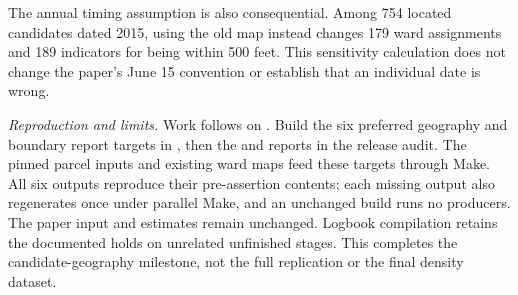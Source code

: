 The annual timing assumption is also consequential. Among 754 located candidates
dated 2015, using the old map instead changes 179 ward assignments and 189
indicators for being within 500 feet. This sensitivity calculation does not change
the paper's June 15 convention or establish that an individual date is wrong.

\textit{Reproduction and limits.} Work follows  on
. Build the six preferred geography and boundary
report targets in , then the
 and 
reports in the release audit. The pinned parcel inputs and existing ward maps feed
these targets through Make. All six outputs reproduce their pre-assertion contents; each missing output also
regenerates once under parallel Make, and an unchanged build runs no producers.
The paper input and estimates remain unchanged.
Logbook compilation retains the documented holds on unrelated unfinished stages.
This completes the candidate-geography milestone, not the full replication or
the final density dataset.

